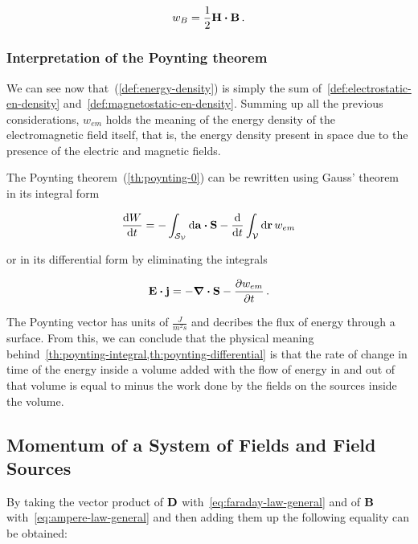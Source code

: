 \documentclass[12pt, class=report, crop=false]{standalone}
\begin{document}
\begin{equation}
  \label{def:magnetostatic-en-density}
  w_{B} = \frac{1}{2} \vb{H}\vdot\vb{B} \,.
\end{equation}

\subsubsection{Interpretation of the Poynting theorem}

We can see now that~(\ref{def:energy-density}) is simply the sum of~\cref{def:electrostatic-en-density} and~\cref{def:magnetostatic-en-density}. Summing up all the previous considerations, \(w_{em}\) holds the meaning of the energy density of the electromagnetic field itself, that is, the energy density present in space due to the presence of the electric and magnetic fields.

\par
The Poynting theorem~(\ref{th:poynting-0}) can be rewritten using Gauss' theorem in its integral form

\begin{equation}
  \label{th:poynting-integral}
  \dv{W}{t} = - \int_{\mathcal{S}_\mathcal{V}} \dd{\vb{a}} \vdot \vb{S} - \dv{t} \int_\mathcal{V} \dd{\vb{r}} w_{em}
\end{equation}

or in its differential form by eliminating the integrals

\begin{equation}
  \label{th:poynting-differential}
  \vb{E}\vdot\vb{j} = - \div{\vb{S}} - \pdv{w_{em}}{t} \,.
\end{equation}

The Poynting vector has units of \(\frac{J}{m^2 s}\) and decribes the flux of energy through a surface. From this, we can conclude that the physical meaning behind~\cref{th:poynting-integral,th:poynting-differential} is that the rate of change in time of the energy inside a volume  added with the flow of energy in and out of that volume is equal to minus the work done by the fields on the sources inside the volume.

\subsection{Momentum of a System of Fields and Field Sources}
\label{section:momentum}
By taking the vector product of \(\vb{D}\) with~\cref{eq:faraday-law-general} and of \(\vb{B}\) with~\cref{eq:ampere-law-general} and then adding them up the following equality can be obtained:
\end{document}
